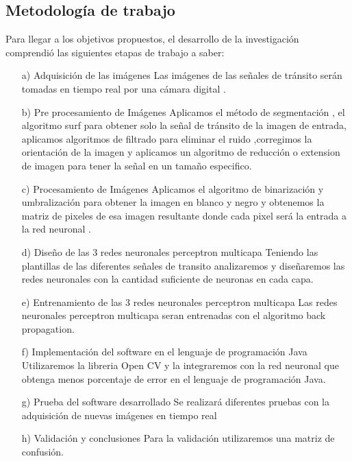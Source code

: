 \documentclass[a4paper, 12pt]{article}
\begin{document}
\subsection{Metodología de trabajo}
\vskip 0.1cm
Para llegar a los objetivos propuestos, el desarrollo de la investigación comprendió las siguientes etapas de trabajo a saber:\par
\begin{enumerate}
\item[a)] Adquisición de las imágenes
\vskip 0.1cm
Las imágenes de las señales de tránsito serán tomadas en tiempo real por una cámara digital .
\item[b)] Pre procesamiento de Imágenes
\vskip 0.1cm
Aplicamos el método de segmentación , el algoritmo surf para obtener solo la señal de tránsito de la imagen de entrada, aplicamos algoritmos de filtrado para eliminar el ruido ,corregimos la orientación de la imagen y aplicamos un algoritmo de reducción o extension de imagen para tener la señal en un tamaño especifico.
\item[c)] Procesamiento de Imágenes
\vskip 0.1cm
Aplicamos el algoritmo de binarización y umbralización para obtener la imagen en blanco y negro y obtenemos la matriz de pixeles de esa imagen resultante donde cada pixel será la entrada a la red neuronal .\par
\item[d)] Diseño de las 3 redes neuronales perceptron multicapa
\vskip 0.1cm
Teniendo las plantillas de las diferentes señales de transito analizaremos y diseñaremos las redes neuronales con la cantidad suficiente de neuronas en cada capa.
\item[e)] Entrenamiento de las 3 redes neuronales perceptron multicapa
\vskip 0.1cm
Las redes neuronales perceptron multicapa seran entrenadas con el algoritmo back propagation.
\item[f)] Implementación del software en el lenguaje de programación Java
\vskip 0.1cm
Utilizaremos la libreria Open CV y la integraremos con la red neuronal que obtenga menos porcentaje de error en el lenguaje de programación Java.
\item[g)] Prueba del software desarrollado
\vskip 0.1cm
Se realizará diferentes pruebas con la adquisición de nuevas imágenes en tiempo real 
\item[h)] Validación y conclusiones
\vskip 0.1cm
Para la validación utilizaremos una matriz de confusión.
   
\end{enumerate}
    
\end{document}
